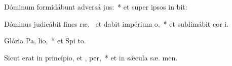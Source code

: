 \item Dóminum formidábunt adversá jus:~* et super ipsos in  bit:
\item Dóminus judicábit fines ræ,~\pscross{} et dabit impérium  o,~* et sublimábit cor  i.
\item Glória Pa,  lio,~* et Spi to.
\item Sicut erat in princípio, et ,  per,~* et in sǽcula sæ. men.
